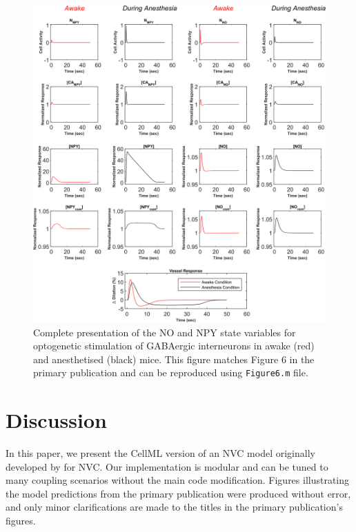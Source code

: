 \documentclass[fleqn,10pt]{physiome}
\begin{document}
\begin{figure}[hbtp]
    \centering
    \includegraphics[scale=0.9, keepaspectratio]{Figure6.png}
    \caption{Complete presentation of the NO and NPY state variables for optogenetic stimulation of GABAergic interneurons in awake (red) and anesthetised (black) mice. This figure matches Figure $6$ in the primary publication and can be reproduced using \texttt{Figure6.m} file.}
    \label{fig:4}
\end{figure}

\section{Discussion}

In this paper, we present the CellML version of an NVC model originally developed by \cite{Sten2020} for NVC. Our implementation is modular and can be tuned to many coupling scenarios without the main code modification. Figures illustrating the model predictions from the primary publication were produced without error, and only minor clarifications are made to the titles in the primary publication's figures.



\end{document}
